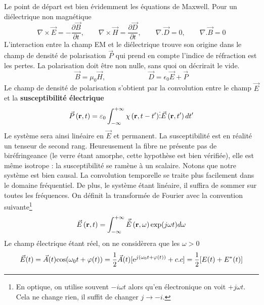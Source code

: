 Le point de départ est bien évidemment les équations de Maxwell. Pour un diélectrique non magnétique
\begin{equation}
\nabla  \times \vec{E} =  - \frac{{\partial  \vec{B}}}{{\partial t}},\qquad
\nabla  \times \vec{H} = \frac{{\partial \vec{D}}}{{\partial t}}, \qquad
\nabla .\vec{D} = 0,\qquad
\nabla .\vec{B} = 0
\end{equation} 
L'interaction entre la champ EM et le diélectrique trouve son origine dans le champ de densité de 
polarisation $\vec{P}$ qui prend en compte l'indice de réfraction est les pertes. La polarisation 
doit être non nulle, sans quoi on décrirait le vide.
\begin{equation}
\vec B = \mu_0\vec{H},\qquad\qquad\qquad \vec{D} = \epsilon_0\vec{E}+\vec{P}
\end{equation}
Le champ de densité de polarisation s'obtient par la convolution entre le champ $\vec{E}$ et la
\textbf{susceptibilité électrique}
\begin{equation}
\vec{P}\left( {{\bf{r}},t} \right) = {\varepsilon _0}\int_{ - \infty }^{ + \infty } {\chi \left( {{\bf{r}},t - t'} \right)}  \vdots \vec{E}\left( {{\bf{r}},t'} \right)dt'
\end{equation}
Le système sera ainsi linéaire en $\vec{E}$ et permanent. La susceptibilité est en réalité un 
tenseur de second rang. Heureusement la fibre ne présente pas de biréfringeance (le verre étant 
amorphe, cette hypothèse est bien vérifiée), elle est même isotrope : la susceptibilité se ramène 
à un scalaire. Notons que notre système est bien causal. La convolution temporelle se traite plus
facilement dans le domaine fréquentiel. De plus, le système étant linéaire, il suffira de sommer 
sur toutes les fréquences. On définit la transformée de Fourier avec la convention suivante\footnote{En optique, on utilise souvent $-i\omega t$ alors qu'en électronique on voit $+j\omega t$. Cela ne change rien, il suffit de changer $j\to -i$.}
\begin{equation}
\vec{E}\left( {{\bf{r}},t} \right) = \int_{ - \infty }^{ + \infty } {\vec{\tilde E}\left( {{\bf{r}},\omega } \right)\exp (j\omega t)d\omega } 
\end{equation}
Le champ électrique étant réel, on ne considèrera que les $\omega >0$
\begin{equation}
\vec{E}{\rm{(}}t{\rm{)}} = \vec{A}{\rm{(}}t{\rm{)cos(}}{\omega _0}t + \varphi {\rm{(}}t{\rm{))}}
 = \frac{1}{2}\vec{A}{\rm{(}}t{\rm{)[}}{{\rm{e}}^{j{\rm{(}}{\omega _0}t + \varphi {\rm{(}}t{\rm{))}}}} + c.c{\rm{]}} = \frac{1}{2}{\rm{[}}E{\rm{(}}t{\rm{)}} + {E^*}{\rm{(}}t{\rm{)]}}
\end{equation}
